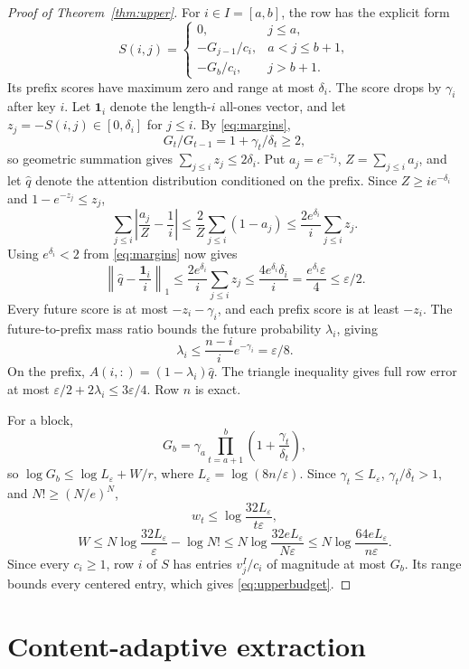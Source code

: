 \documentclass[10pt]{article}
\theoremstyle{definition}
\newcommand{\one}{\mathbf 1}
\begin{document}
\begin{proof}[Proof of Theorem~\ref{thm:upper}]
For \(i\in I=[a,b]\), the row has the explicit form
\[
 S(i,j)=
 \begin{cases}
  0,&j\le a,\\
  -G_{j-1}/c_i,&a<j\le b+1,\\
  -G_b/c_i,&j>b+1.
 \end{cases}
\]
Its prefix scores have maximum zero and range at most \(\delta_i\).  The
score drops by \(\gamma_i\) after key \(i\).  Let \(\one_i\) denote the
length-\(i\) all-ones vector, and let
\(z_j=-S(i,j)\in[0,\delta_i]\) for \(j\le i\).  By
\eqref{eq:margins},
\[
 G_t/G_{t-1}=1+\gamma_t/\delta_t\ge2,
\]
so geometric summation gives \(\sum_{j\le i}z_j\le2\delta_i\).  Put
\(a_j=e^{-z_j}\), \(Z=\sum_{j\le i}a_j\), and let \(\widehat q\) denote the
attention distribution conditioned on the prefix.  Since
\(Z\ge i e^{-\delta_i}\) and \(1-e^{-z_j}\le z_j\),
\[
 \sum_{j\le i}\left|\frac{a_j}{Z}-\frac1i\right|
 \le \frac{2}{Z}\sum_{j\le i}(1-a_j)
 \le \frac{2e^{\delta_i}}i\sum_{j\le i}z_j.
\]
Using \(e^{\delta_i}<2\) from \eqref{eq:margins} now gives
\[
 \left\|\widehat q-\frac{\one_i}{i}\right\|_1
 \le\frac{2e^{\delta_i}}i\sum_{j\le i}z_j
 \le\frac{4e^{\delta_i}\delta_i}i
 =\frac{e^{\delta_i}\varepsilon}4
 \le\varepsilon/2.
\]
Every future score is at most \(-z_i-\gamma_i\), and each prefix score is at
least \(-z_i\).  The future-to-prefix mass ratio bounds the future probability
\(\lambda_i\), giving
\[
 \lambda_i\le\frac{n-i}{i}e^{-\gamma_i}=\varepsilon/8.
\]
On the prefix, \(A(i,:)= (1-\lambda_i)\widehat q\).  The triangle inequality
gives full row error at most
\(\varepsilon/2+2\lambda_i\le3\varepsilon/4\).  Row \(n\) is exact.

For a block,
\[
 G_b=\gamma_a\prod_{t=a+1}^{b}
 \left(1+\frac{\gamma_t}{\delta_t}\right),
\]
so \(\log G_b\le\log L_\varepsilon+W/r\), where
\(L_\varepsilon=\log(8n/\varepsilon)\).  Since
\(\gamma_t\le L_\varepsilon\), \(\gamma_t/\delta_t>1\), and
\(N!\ge(N/e)^N\),
\[
 w_t\le\log\frac{32L_\varepsilon}{t\varepsilon},
\]
\[
 W\le N\log\frac{32L_\varepsilon}{\varepsilon}-\log N!
 \le N\log\frac{32eL_\varepsilon}{N\varepsilon}
 \le N\log\frac{64eL_\varepsilon}{n\varepsilon}.
\]
Since every \(c_i\ge1\), row \(i\) of \(S\) has entries \(v^I_j/c_i\) of
magnitude at most \(G_b\).  Its range bounds every centered entry, which gives
\eqref{eq:upperbudget}.
\end{proof}

\section{Content-adaptive extraction}\label{app:adaptive}
\end{document}

